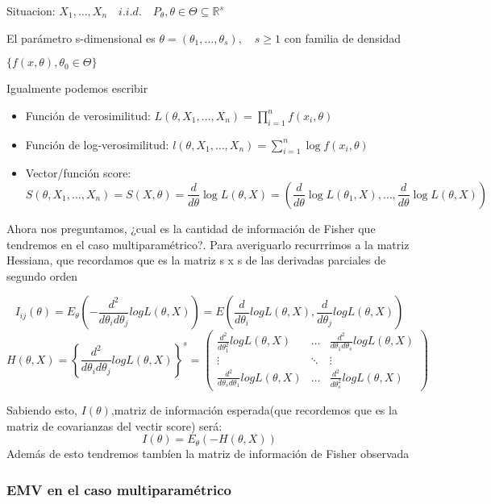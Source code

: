 Situacion:
\(
X_1,\dots,X_n \quad i.i.d. \quad P_\theta,\theta \in \Theta \subseteq \mathbb{R}^s \)  

El parámetro s-dimensional es
\(
\theta = (\theta_1,\dots,\theta_s), \quad s \geq 1 \)
 con familia de densidad 

 \(
 \{ f(x,\theta),\theta_0 \in \Theta\}
\)

Igualmente podemos escribir

\begin{itemize}
    \item Función de verosimilitud: $L(\theta,X_1,\dots,X_n)=\prod^{n}_{i=1} f(x_i,\theta)$
    \item Función de log-verosimilitud: $l(\theta,X_1,\dots,X_n)=\sum^{n}_{i=1} \log f(x_i,\theta)$
    \item Vector/función score: $$S(\theta,X_1,\dots,X_n)=S(X,\theta)=\frac{d}{d \theta} \log L(\theta,X)
    = \left(\frac{d}{d \theta} \log L(\theta_1,X),\dots,\frac{d}{d \theta} \log L(\theta,X)\right)$$
\end{itemize}

Ahora nos preguntamos, ¿cual es la cantidad de información de Fisher que tendremos en el caso multiparamétrico?.
Para averiguarlo recurrrimos a la matriz Hessiana, que recordamos que es la matriz s x s de las derivadas parciales de segundo orden

\[
I_{ij}(\theta)=E_\theta\left(-\frac{d^2}{d \theta_i d \theta_j} log L(\theta,X)\right)
=E\left(\frac{d}{d \theta_i} log L(\theta,X),\frac{d}{d \theta_j} log L(\theta,X)\right)
\]
\[
H(\theta,X)=\left\{ \frac{d^2}{d \theta_i d \theta_j}log L(\theta,X) \right\}^s 
=
\begin{pmatrix}
    \frac{d^2}{d \theta_1^2}log L(\theta,X) & \dots & \frac{d^2}{d \theta_1 d \theta_s}log L(\theta,X) \\
    \vdots & \ddots & \vdots \\
    \frac{d^2}{d \theta_s d \theta_1}log L(\theta,X) & \dots & \frac{d^2}{d \theta_s^2}log L(\theta,X)
\end{pmatrix}
\]

Sabiendo esto, $I(\theta)$,matriz de información esperada(que recordemos que es la matriz de covarianzas del vectir score) será:
\[
I(\theta) = E_\theta(-H(\theta,X))
\]
Además de esto tendremos tambíen la matriz de información de Fisher observada

\subsubsection{EMV en el caso multiparamétrico}

